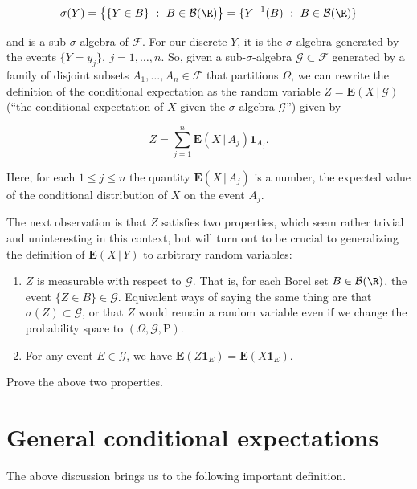 \[
\sigma(Y) = \big\{ \{Y \in B\}\ :\ B\in\mathcal{B}(\R) \big\}
= \{ Y^{-1}(B)\ :\ B\in\mathcal{B}(\R) \}
\]

\noindent and is a sub-$\sigma$-algebra of $\mathcal{F}$. For
our discrete $Y$, it is the $\sigma$-algebra
generated by the events $\{Y=y_j\}, \ j=1,\ldots,n$.
So, given a sub-$\sigma$-algebra
$\mathcal{G} \subset \mathcal{F}$ generated by a
family of disjoint subsets
$A_1,\ldots,A_n \in \mathcal{F}$ that partitions
$\Omega$, we can rewrite the definition of the
conditional expectation as the random variable
$Z = \mathbf{E}\left(X\,|\,\mathcal{G}\right)$ (``the
conditional expectation of $X$ given the
$\sigma$-algebra $\mathcal{G}$'') given by

\[
Z = \sum_{j=1}^n \mathbf{E}\left(X\,|\,A_j\right) \mathbf{1}_{A_j}.
\]

\noindent Here, for each $1\le j\le n$ the quantity
$\mathbf{E}\left(X\,|\,A_j\right)$ is a number, the
expected value of the conditional distribution of $X$
on the event $A_j$.

The next observation is that $Z$ satisfies two
properties, which seem rather trivial and
uninteresting in this context, but will turn out to be
crucial to generalizing the definition of
$\mathbf{E}\left(X\,|\,Y\right)$ to arbitrary random
variables:

\begin{enumerate}[label=(\roman*)]
\item $Z$ is measurable with respect to $\mathcal{G}$. That
is, for each Borel set $B\in \mathcal{B}(\R)$, the
event $\{Z\in B\} \in \mathcal{G}$. Equivalent ways
of saying the same thing are that
$\sigma(Z)\subset \mathcal{G}$, or that $Z$ would
remain a random variable even if we change the
probability space to
$(\Omega,\mathcal{G},\mathrm{P})$.

\item For any event $E \in \mathcal{G}$, we have
$\mathbf{E}(Z \mathbf{1}_E) = \mathbf{E}(X
\mathbf{1}_E)$.
\end{enumerate}

\begin{xexercise}
Prove the above two properties.
\end{xexercise}

\section{General conditional expectations}
The above discussion brings us to the following
important definition.

